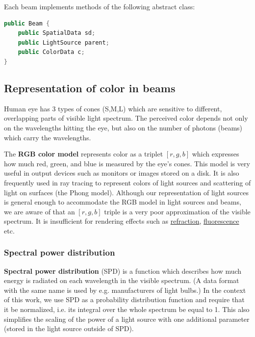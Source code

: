 \documentclass[12pt, letterpaper]{article}
\begin{document}
Each beam implements methods of the following abstract class:
\begin{lstlisting}[language=Java]
public Beam {
	public SpatialData sd;
	public LightSource parent;
	public ColorData c;
}
\end{lstlisting}


\subsection{Representation of color in beams}

Human eye has 3 types of cones (S,M,L) which are sensitive to different, overlapping parts of visible light spectrum.
The perceived color depends not only on the wavelengths hitting the eye, but also on the number of photons (beams) which carry the wavelengths.

The \textbf{RGB color model} represents color as a triplet $[r, g, b]$ which expresses how much red, green, and blue is measured by the eye's cones. This model is very useful in output devices such as monitors or images stored on a disk. It is also frequently used in ray tracing to represent colors of light sources and scattering of light on surfaces (the Phong model). Although our representation of light sources is general enough to accommodate the RGB model in light sources and beams, we are aware of that an $[r, g, b]$ triple is a very poor approximation of the visible spectrum. It is insufficient for rendering effects such as \href{https://en.wikipedia.org/wiki/Refraction}{refraction}, \href{https://en.wikipedia.org/wiki/Fluorescence}{fluorescence} etc. 


\subsubsection{Spectral power distribution}

\textbf{Spectral power distribution} (SPD) is a function which describes how much energy is radiated on each wavelength in the visible spectrum. (A data format with the same name is used by e.g. manufacturers of light bulbs.) In the context of this work, we use SPD as a probability distribution function and require that it be normalized, i.e.  its integral over the whole spectrum be equal to 1. This also simplifies the scaling of the power of a light source with one additional parameter (stored in the light source outside of SPD).
\end{document}
